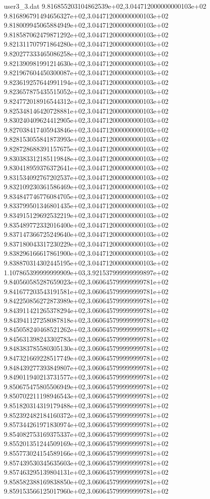 \begin{filecontents}{user3_3.dat}
9.816855203104862539e+02,3.044712000000000103e+02
9.816896791494656327e+02,3.044712000000000103e+02
9.818009945065884949e+02,3.044712000000000103e+02
9.818587062479871292e+02,3.044712000000000103e+02
9.821311707971864280e+02,3.044712000000000103e+02
9.820277333465086258e+02,3.044712000000000103e+02
9.821390981991214630e+02,3.044712000000000103e+02
9.821967604450300087e+02,3.044712000000000103e+02
9.823619257644991194e+02,3.044712000000000103e+02
9.823657875435515052e+02,3.044712000000000103e+02
9.824772018916544312e+02,3.044712000000000103e+02
9.825348146420728881e+02,3.044712000000000103e+02
9.830240409624412905e+02,3.044712000000000103e+02
9.827038417405943846e+02,3.044712000000000103e+02
9.828153055841873993e+02,3.044712000000000103e+02
9.828728688391157675e+02,3.044712000000000103e+02
9.830383312185119848e+02,3.044712000000000103e+02
9.830418959376372641e+02,3.044712000000000103e+02
9.831534092767202537e+02,3.044712000000000103e+02
9.832109230361586469e+02,3.044712000000000103e+02
9.834847746776084705e+02,3.044712000000000103e+02
9.833799501346801435e+02,3.044712000000000103e+02
9.834915129692532219e+02,3.044712000000000103e+02
9.835489772332016400e+02,3.044712000000000103e+02
9.837147366725249640e+02,3.044712000000000103e+02
9.837180043317230229e+02,3.044712000000000103e+02
9.838296166617861900e+02,3.044712000000000103e+02
9.838870314302445195e+02,3.044712000000000103e+02
1.107865399999999909e+03,3.921537999999999897e+02
9.840560585287659023e+02,3.060645799999999781e+02
9.841677203543191581e+02,3.060645799999999781e+02
9.842250856272873989e+02,3.060645799999999781e+02
9.843911421265378294e+02,3.060645799999999781e+02
9.843941127258087818e+02,3.060645799999999781e+02
9.845058240468521262e+02,3.060645799999999781e+02
9.845631398243302783e+02,3.060645799999999781e+02
9.848383785580305130e+02,3.060645799999999781e+02
9.847321669228517749e+02,3.060645799999999781e+02
9.848439277393849807e+02,3.060645799999999781e+02
9.849011940213731577e+02,3.060645799999999781e+02
9.850675475805506949e+02,3.060645799999999781e+02
9.850702211198946543e+02,3.060645799999999781e+02
9.851820314319179488e+02,3.060645799999999781e+02
9.852392482184160372e+02,3.060645799999999781e+02
9.857344261971830974e+02,3.060645799999999781e+02
9.854082753169375337e+02,3.060645799999999781e+02
9.855201351244509169e+02,3.060645799999999781e+02
9.855773024154589166e+02,3.060645799999999781e+02
9.857439530345635603e+02,3.060645799999999781e+02
9.857463295139804131e+02,3.060645799999999781e+02
9.858582388169838850e+02,3.060645799999999781e+02
9.859153566125017960e+02,3.060645799999999781e+02

\end{filecontents}
